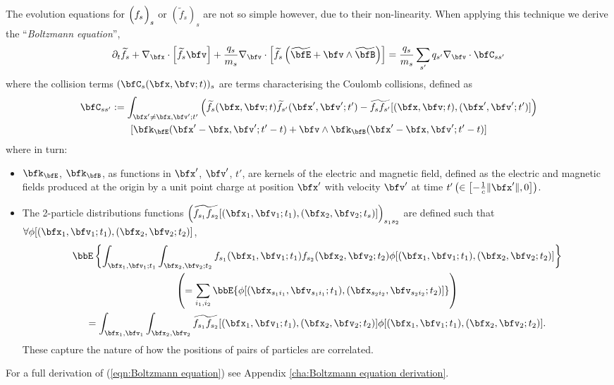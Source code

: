     The evolution equations for $\left(f_{s}{\color{white} \widetilde{f}_{s}}\!\!\!\!\!\right)_{s}$ or $\left(\widetilde{f}_{s}\right)_{s}$ are not so simple however, due to their non-linearity. When applying this technique we derive the ``\emph{Boltzmann equation}'', \BA{[Ref]}
    \begin{equation}\label{eqn:Boltzmann equation}
        \partial_{t}\widetilde{f}_{s} + \nabla_{\bfx}\cdot\left[\widetilde{f}_{s}\bfv\right] + \frac{q_{s}}{m_{s}}\nabla_{\bfv}\cdot\left[\widetilde{f}_{s}\left(\widetilde{\bfE} + \bfv\wedge\widetilde{\bfB}\right)\right]  =   \frac{q_{s}}{m_{s}}\sum_{s'}q_{s'}\nabla_{\bfv}\cdot\bfC_{ss'}
    \end{equation}
    where the collision terms $(\bfC_{s}(\bfx, \bfv; t))_{s}$ are terms characterising the Coulomb collisions, defined as
    \begin{multline}\label{eqn:collision operator}
        \bfC_{ss'}  :=  \int_{\bfx' \neq \bfx, \bfv'; t'}\left(\widetilde{f}_{s}(\bfx, \bfv; t)\widetilde{f}_{s'}(\bfx', \bfv'; t') - \widetilde{f_{s}f_{s'}}[(\bfx, \bfv; t), (\bfx', \bfv'; t')]\right)  \\
        [\bfk_{\bfE}(\bfx' - \bfx, \bfv'; t' - t) + \bfv\wedge\bfk_{\bfB}(\bfx' - \bfx, \bfv'; t' - t)]
    \end{multline}
    where in turn:
    \begin{itemize}
        \item  $\bfk_{\bfE}$, $\bfk_{\bfB}$, as functions in $\bfx'$, $\bfv'$, $t'$, are kernels of the electric and magnetic field, defined as the electric and magnetic fields produced at the origin by a unit point charge at position $\bfx'$ with velocity $\bfv'$ at time $t' \left(\in \left[-\frac{1}{c}\|\bfx'\|, 0\right]\right)$. 
        
        \item  The 2-particle distributions functions $\left(\widetilde{f_{s_{1}}f_{s_{2}}}[(\bfx_{1}, \bfv_{1}; t_{1}), (\bfx_{2}, \bfv_{2}; t_{s})]\right)_{s_{1}s_{2}}$ are defined such that $\forall \phi[(\bfx_{1}, \bfv_{1}; t_{1}), (\bfx_{2}, \bfv_{2}; t_{2})]$,
        \begin{multline}
            \bbE\left\{\int_{\bfx_{1}, \bfv_{1}; t_{1}}\int_{\bfx_{2}, \bfv_{2}; t_{2}}f_{s_{1}}(\bfx_{1}, \bfv_{1}; t_{1})f_{s_{2}}(\bfx_{2}, \bfv_{2}; t_{2})\phi[(\bfx_{1}, \bfv_{1}; t_{1}), (\bfx_{2}, \bfv_{2}; t_{2})]\right\}  \\
            \left(=  \sum_{i_{1}, i_{2}}\bbE\{\phi[(\bfx_{s_{1}i_{1}}, \bfv_{s_{1}i_{1}}; t_{1}), (\bfx_{s_{2}i_{2}}, \bfv_{s_{2}i_{2}}; t_{2})]\}\right)  \\
            =  \int_{\bfx_{1}, \bfv_{1}}\int_{\bfx_{2}, \bfv_{2}}\widetilde{f_{s_{1}}f_{s_{2}}}[(\bfx_{1}, \bfv_{1}; t_{1}), (\bfx_{2}, \bfv_{2}; t_{2})]\phi[(\bfx_{1}, \bfv_{1}; t_{1}), (\bfx_{2}, \bfv_{2}; t_{2})].
        \end{multline}
        These capture the nature of how the positions of pairs of particles are correlated.
    \end{itemize}
    For a full derivation of (\ref{eqn:Boltzmann equation}) see Appendix \ref{cha:Boltzmann equation derivation}.

